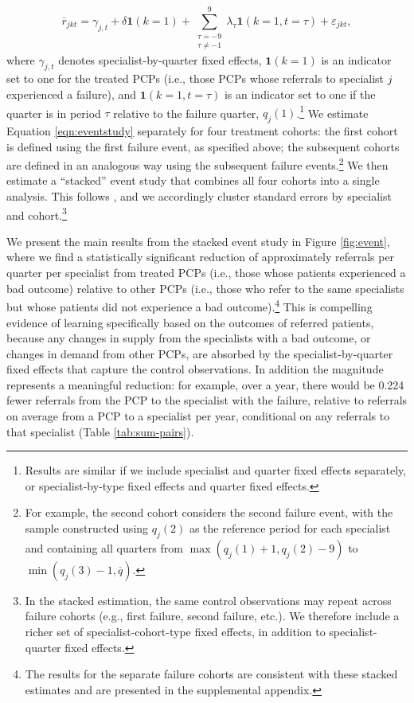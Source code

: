 \documentclass[12pt]{article}
\begin{document}
\begin{equation}
  \bar{r}_{jkt} = \gamma_{j,t} + \delta \mathbf{1}(k=1) + \sum_{\substack{\tau=-9 \\ \tau \neq -1}}^{9} \lambda_{\tau} \mathbf{1}(k=1, t=\tau) + \varepsilon_{jkt},
  \label{eqn:eventstudy}
\end{equation}
where $\gamma_{j,t}$ denotes specialist-by-quarter fixed effects, $\mathbf{1}(k=1)$ is an indicator set to one for the treated PCPs (i.e., those PCPs whose referrals to specialist $j$ experienced a failure), and $\mathbf{1}(k=1, t=\tau)$ is an indicator set to one if the quarter is in period $\tau$ relative to the failure quarter, $q_{j}(1)$.\footnote{Results are similar if we include specialist and quarter fixed effects separately, or specialist-by-type fixed effects and quarter fixed effects.} We estimate Equation \eqref{eqn:eventstudy} separately for four treatment cohorts: the first cohort is defined using the first failure event, as specified above; the subsequent cohorts are defined in an analogous way using the subsequent failure events.\footnote{For example, the second cohort considers the second failure event, with the sample constructed using $q_{j}(2)$ as the reference period for each specialist and containing all quarters from $\max(q_j(1) + 1, q_j(2)-9)$ to $\min(q_{j}(3)-1, \overline{q})$.} We then estimate a ``stacked'' event study that combines all four cohorts into a single analysis. This follows \cite{cengiz2019}, and we accordingly cluster standard errors by specialist and cohort.\footnote{In the stacked estimation, the same control observations may repeat across failure cohorts (e.g., first failure, second failure, etc.). We therefore include a richer set of specialist-cohort-type fixed effects, in addition to specialist-quarter fixed effects.}

We present the main results from the stacked event study in Figure \ref{fig:event}, where we find a statistically significant reduction of approximately \eventStudyCoef{} referrals per quarter per specialist from treated PCPs (i.e., those whose patients experienced a bad outcome) relative to other PCPs (i.e., those who refer to the same specialists but whose patients did not experience a bad outcome).\footnote{The results for the separate failure cohorts are consistent with these stacked estimates and are presented in the supplemental appendix.} This is compelling evidence of learning specifically based on the outcomes of referred patients, because any changes in supply from the specialists with a bad outcome, or changes in demand from other PCPs, are absorbed by the specialist-by-quarter fixed effects that capture the control observations. In addition the magnitude represents a meaningful reduction: for example, over a year, there would be 0.224 fewer referrals from the PCP to the specialist with the failure, relative to \meanRefsPerPair{} referrals on average from a PCP to a specialist per year, conditional on any referrals to that specialist (Table \ref{tab:sum-pairs}).
\end{document}
